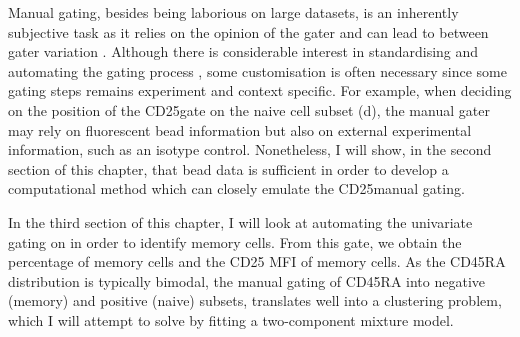 Manual gating, besides being laborious on large datasets, is an inherently subjective task as it relies on the opinion of the gater and can lead to
between gater variation \citep{Maecker:2005gm}.
Although there is considerable interest in standardising and automating the gating process \citep{Aghaeepour:2013dg},
some customisation is often necessary since some gating steps remains experiment and context specific.  
For example, when deciding on the position of the CD25\positive gate on the naive cell subset (d), the manual gater may rely on fluorescent bead information but also on external experimental information, such as an isotype control.
Nonetheless, I will show, in the second section of this chapter, that bead data is sufficient in order to develop a computational method which can closely emulate the CD25\positive manual gating.

In the third section of this chapter, I will look at automating the univariate gating on 
in order to identify memory cells.
From this gate, we obtain the percentage of memory cells and the CD25 MFI of memory cells.  
As the CD45RA distribution is typically bimodal, the manual gating of CD45RA into negative (memory) and positive (naive) subsets,
translates well into a clustering problem, which I will attempt to solve by fitting a two-component mixture model.

